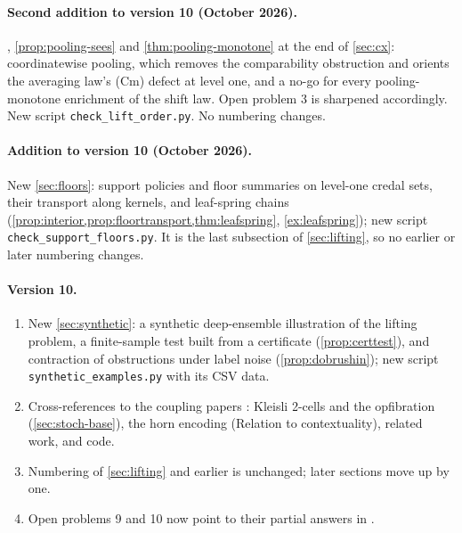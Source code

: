 \documentclass[11pt]{article}
\theoremstyle{definition}
\theoremstyle{remark}
\begin{document}
\paragraph{Second addition to version 10 (October 2026).} , \cref{prop:pooling-sees} and
\cref{thm:pooling-monotone} at the end of \cref{sec:cx}: coordinatewise pooling, which removes the comparability obstruction and
orients the averaging law's (Cm) defect at level one, and a no-go for every pooling-monotone enrichment of the shift law. Open
problem 3 is sharpened accordingly. New script \texttt{check\_lift\_order.py}. No numbering changes.

\paragraph{Addition to version 10 (October 2026).} New \cref{sec:floors}: support policies and floor summaries on level-one
credal sets, their transport along kernels, and leaf-spring chains (\cref{prop:interior,prop:floortransport,thm:leafspring},
\cref{ex:leafspring}); new script \texttt{check\_support\_floors.py}. It is the last subsection of \cref{sec:lifting}, so no
earlier or later numbering changes.

\paragraph{Version 10.}
\begin{enumerate}[leftmargin=*,label=(\alph*)]
\item New \cref{sec:synthetic}: a synthetic deep-ensemble illustration of the lifting problem, a finite-sample test
  built from a certificate (\cref{prop:certtest}), and contraction of obstructions under label noise
  (\cref{prop:dobrushin}); new script \texttt{synthetic\_examples.py} with its CSV data.
\item Cross-references to the coupling papers \cite{Conditionals,Awasthi-Family}: Kleisli 2-cells and the opfibration
  (\cref{sec:stoch-base}), the horn encoding (Relation to contextuality), related work, and code.
\item Numbering of \cref{sec:lifting} and earlier is unchanged; later sections move up by one.
\item Open problems 9 and 10 now point to their partial answers in \cite{Awasthi-ThreeLayers}.
\end{enumerate}
\end{document}
